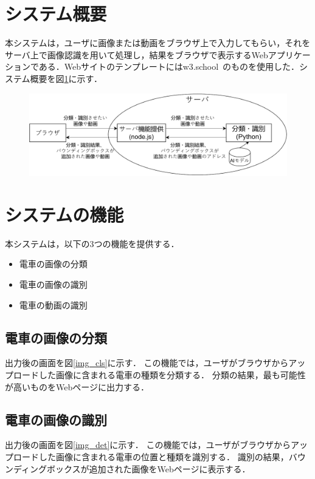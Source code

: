 \begin{multicols*}{2}
\section{システム概要}
本システムは，ユーザに画像または動画をブラウザ上で入力してもらい，それをサーバ上で画像認識を用いて処理し，結果をブラウザで表示するWebアプリケーションである．Webサイトのテンプレートにはw3.school~\cite{bk0}のものを使用した．システム概要を図\ref{abc}に示す．
\begin{figure} %
	\label{abc}
	\centering
	\includegraphics[width=\linewidth]{obj/sys_gaiyou6.pdf}
\end{figure}

\section{システムの機能}
本システムは，以下の3つの機能を提供する．
\begin{itemize}
	\item 電車の画像の分類
	\item 電車の画像の識別
	\item 電車の動画の識別
\end{itemize}

\subsection{電車の画像の分類} 
出力後の画面を図\ref{img_cls}に示す．
この機能では，ユーザがブラウザからアップロードした画像に含まれる電車の種類を分類する． 分類の結果，最も可能性が高いものをWebページに出力する．
\subsection{電車の画像の識別}
出力後の画面を図\ref{img_det}に示す．
この機能では，ユーザがブラウザからアップロードした画像に含まれる電車の位置と種類を識別する．  識別の結果，バウンディングボックスが追加された画像をWebページに表示する．

\end{multicols*}

